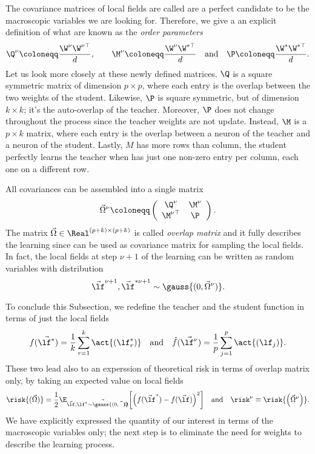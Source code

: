 The covariance matrices of local fields are called are a perfect candidate to be
the macroscopic variables we are looking for. Therefore, we give a an explicit 
definition of what are known as the \emph{order parameters}
\begin{equation} \label{eq:order_parameters_definiton}
  \Q^\nu \coloneqq \frac{\W^\nu \W^{\nu\top}}{d}, \qquad
  \M^\nu \coloneqq \frac{\W^\nu \W^{*\top}}{d} \quad\text{and}\quad
  \P \coloneqq \frac{\W^* \W^{*\top}}{d}.
\end{equation}
Let us look more closely at these newly defined matrices. \(\Q\) is a square symmetric
matrix of dimension \(p\times p\), where each entry is the overlap between the two
weights of the student. Likewise, \(\P\) is square symmetric, but of dimension \(k\times k\);
it's the auto-overlap of the teacher. Moreover, \(\P\) does not change throughout
the process since the teacher weights are not update. Instead, \(\M\) is a \(p\times k\)
matrix, where each entry is the overlap between a neuron of the teacher and a neuron
of the student. Lastly, \(M\) has more rows than column, the student perfectly 
learns the teacher when has just one non-zero entry per column, each one on a different row.

All covariances can be assembled into a single matrix
\[
  \vec{\Omega}^\nu \coloneqq \left(\begin{array}{cc}
    \Q^\nu & \M^\nu \\
    \M^{\nu\top} & \P
  \end{array}\right).
\]
The matrix \(\vec{\Omega}\in\Real^{(p+k)\times(p+k)}\) is called \emph{overlap matrix} and it fully
describes the learning since can be used as covariance matrix for sampling the local fields.
In fact, the local fields at step \(\nu+1\) of the learning can be written as random variables with distribution
\[\vec{\lf}^{\nu+1},\vec{\lf}^{*\nu+1} \sim \gauss{(0,\vec{\Omega}^\nu)}.\]

To conclude this Subsection, we redefine the teacher and the student function
in terms of just the local fields
\[
  f{(\vec{\lf^*})} = \frac{1}{k}\sum_{r=1}^{k} \act{\left(\lf^*_r\right)}\quad\text{and}\quad
  \hat{f}{(\vec{\lf^{\nu}})} = \frac{1}{p}\sum_{j=1}^{p} \act{\left(\lf_j\right)}.
\]
These two lead also to an experssion of theoretical risk in terms of overlap matrix only, 
by taking an expected value on local fields
\begin{equation}\label{eq:riskfunctionalOmega}
  \risk{(\vec{\Omega})} = \frac12\E_{\vec{\lf},\vec{\lf^* \sim \gauss{(0,\vec{\Omega})}}}
                              {\left[\left(f{(\vec{\lf}^*)} - f{(\vec{\lf})}\right)^2\right]}
  \quad\text{and}\quad\risk^\nu \equiv \risk{\left(\vec{\Omega}^\nu\right)}.
\end{equation}
We have explicitly expressed the quantity of our interest in terms of the macroscopic 
variables only; the next step is to eliminate the need for weights to describe the learning process.





